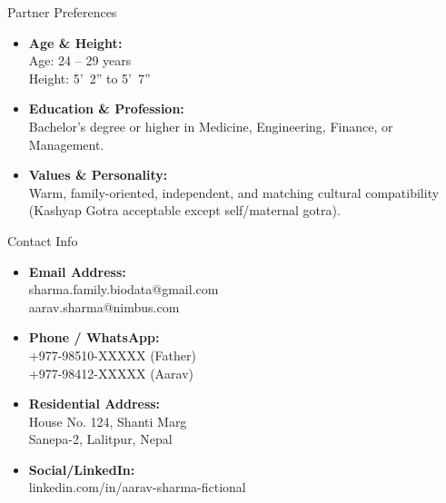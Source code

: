 \documentclass[11pt,a4paper]{article}
\begin{document}
\begin{minipage}[t]{0.48\textwidth}
  \vspace{0pt}
  \begin{sectionbox}{Partner Preferences}
    \begin{itemize}[leftmargin=*, label={\color{Gold}\faHeart}]
      \item \textbf{Age \& Height:} \\
            Age: 24 -- 29 years \\
            Height: 5'\ 2'' to 5'\ 7''
      \item \textbf{Education \& Profession:} \\
            Bachelor's degree or higher in Medicine, Engineering, Finance, or Management.
      \item \textbf{Values \& Personality:} \\
            Warm, family-oriented, independent, and matching cultural compatibility (Kashyap Gotra acceptable except self/maternal gotra).
    \end{itemize}
  \end{sectionbox}
\end{minipage}%
\hfill
\begin{minipage}[t]{0.48\textwidth}
  \vspace{0pt}
  \begin{sectionbox}{Contact Info}
    \begin{itemize}[leftmargin=*, label={\color{DeepRed}\faEnvelope}]
      \item \textbf{Email Address:} \\
            sharma.family.biodata@gmail.com \\
            aarav.sharma@nimbus.com
      \item \textbf{Phone / WhatsApp:} \\
            +977-98510-XXXXX (Father) \\
            +977-98412-XXXXX (Aarav)
      \item \textbf{Residential Address:} \\
            House No. 124, Shanti Marg \\
            Sanepa-2, Lalitpur, Nepal
      \item \textbf{Social/LinkedIn:} \\
            linkedin.com/in/aarav-sharma-fictional
    \end{itemize}
  \end{sectionbox}
\end{minipage}
\end{document}
